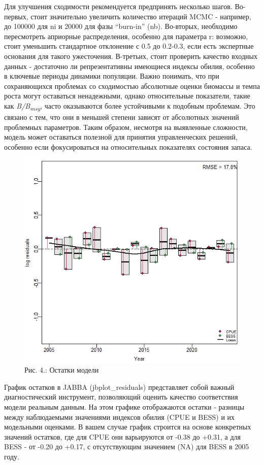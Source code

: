 \documentclass[
  letterpaper,
  DIV=11,
  numbers=noendperiod]{scrreprt}
\begin{document}
Для улучшения сходимости рекомендуется предпринять несколько шагов.
Во-первых, стоит значительно увеличить количество итераций MCMC -
например, до 100000 для ni и 20000 для фазы ``burn-in'' (nb). Во-вторых,
необходимо пересмотреть априорные распределения, особенно для параметра
r: возможно, стоит уменьшить стандартное отклонение с 0.5 до 0.2-0.3,
если есть экспертные основания для такого ужесточения. В-третьих, стоит
проверить качество входных данных - достаточно ли репрезентативны
имеющиеся индексы обилия, особенно в ключевые периоды динамики
популяции. Важно понимать, что при сохраняющихся проблемах со
сходимостью абсолютные оценки биомассы и темпа роста могут оставаться
ненадежными, однако относительные показатели, такие как
\emph{B/B\textsubscript{msy}}, часто оказываются более устойчивыми к
подобным проблемам. Это связано с тем, что они в меньшей степени зависят
от абсолютных значений проблемных параметров. Таким образом, несмотря на
выявленные сложности, модель может оставаться полезной для принятия
управленческих решений, особенно если фокусироваться на относительных
показателях состояния запаса.

\begin{figure}[H]

{\centering \includegraphics[width=0.6\linewidth,height=\textheight,keepaspectratio]{images/JABBA4.PNG}

}

\caption{Рис. 4.: Остатки модели}

\end{figure}%

График остатков в JABBA (jbplot\_residuals) представляет собой важный
диагностический инструмент, позволяющий оценить качество соответствия
модели реальным данным. На этом графике отображаются остатки - разницы
между наблюдаемыми значениями индексов обилия (CPUE и BESS) и их
модельными оценками. В вашем случае график строится на основе конкретных
значений остатков, где для CPUE они варьируются от -0.38 до +0.31, а для
BESS - от -0.20 до +0.17, с отсутствующим значением (NA) для BESS в 2005
году.
\end{document}
